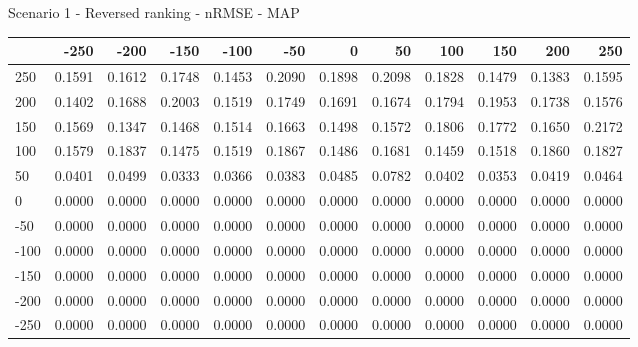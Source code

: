 Scenario 1 - Reversed ranking - nRMSE - MAP
\begin{tabular}{lrrrrrrrrrrr}
\toprule
{} &   -250 &   -200 &   -150 &   -100 &   -50  &    0   &    50  &    100 &    150 &    200 &    250 \\
\midrule
 250 & 0.1591 & 0.1612 & 0.1748 & 0.1453 & 0.2090 & 0.1898 & 0.2098 & 0.1828 & 0.1479 & 0.1383 & 0.1595 \\
 200 & 0.1402 & 0.1688 & 0.2003 & 0.1519 & 0.1749 & 0.1691 & 0.1674 & 0.1794 & 0.1953 & 0.1738 & 0.1576 \\
 150 & 0.1569 & 0.1347 & 0.1468 & 0.1514 & 0.1663 & 0.1498 & 0.1572 & 0.1806 & 0.1772 & 0.1650 & 0.2172 \\
 100 & 0.1579 & 0.1837 & 0.1475 & 0.1519 & 0.1867 & 0.1486 & 0.1681 & 0.1459 & 0.1518 & 0.1860 & 0.1827 \\
 50  & 0.0401 & 0.0499 & 0.0333 & 0.0366 & 0.0383 & 0.0485 & 0.0782 & 0.0402 & 0.0353 & 0.0419 & 0.0464 \\
 0   & 0.0000 & 0.0000 & 0.0000 & 0.0000 & 0.0000 & 0.0000 & 0.0000 & 0.0000 & 0.0000 & 0.0000 & 0.0000 \\
-50  & 0.0000 & 0.0000 & 0.0000 & 0.0000 & 0.0000 & 0.0000 & 0.0000 & 0.0000 & 0.0000 & 0.0000 & 0.0000 \\
-100 & 0.0000 & 0.0000 & 0.0000 & 0.0000 & 0.0000 & 0.0000 & 0.0000 & 0.0000 & 0.0000 & 0.0000 & 0.0000 \\
-150 & 0.0000 & 0.0000 & 0.0000 & 0.0000 & 0.0000 & 0.0000 & 0.0000 & 0.0000 & 0.0000 & 0.0000 & 0.0000 \\
-200 & 0.0000 & 0.0000 & 0.0000 & 0.0000 & 0.0000 & 0.0000 & 0.0000 & 0.0000 & 0.0000 & 0.0000 & 0.0000 \\
-250 & 0.0000 & 0.0000 & 0.0000 & 0.0000 & 0.0000 & 0.0000 & 0.0000 & 0.0000 & 0.0000 & 0.0000 & 0.0000 \\
\bottomrule
\end{tabular}

